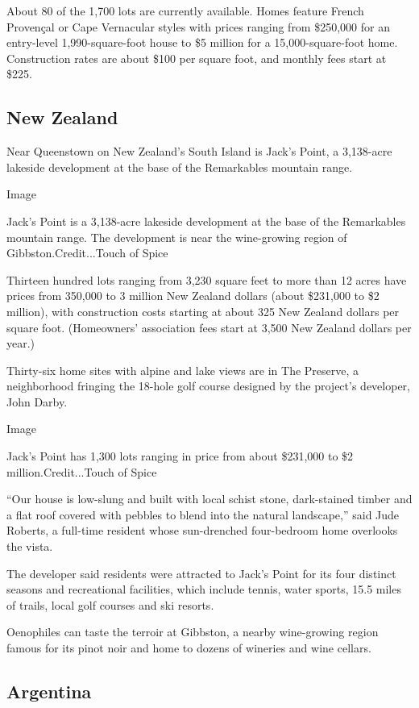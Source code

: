 About 80 of the 1,700 lots are currently available. Homes feature French
Provençal or Cape Vernacular styles with prices ranging from \$250,000
for an entry-level 1,990-square-foot house to \$5 million for a
15,000-square-foot home. Construction rates are about \$100 per square
foot, and monthly fees start at \$225.

\hypertarget{new-zealand}{%
\subsection{New Zealand}\label{new-zealand}}

Near Queenstown on New Zealand's South Island is Jack's Point, a
3,138-acre lakeside development at the base of the Remarkables mountain
range.

Image

Jack's Point is a 3,138-acre lakeside development at the base of the
Remarkables mountain range. The development is near the wine-growing
region of Gibbston.Credit...Touch of Spice

Thirteen hundred lots ranging from 3,230 square feet to more than 12
acres have prices from 350,000 to 3 million New Zealand dollars (about
\$231,000 to \$2 million), with construction costs starting at about 325
New Zealand dollars per square foot. (Homeowners' association fees start
at 3,500 New Zealand dollars per year.)

Thirty-six home sites with alpine and lake views are in The Preserve, a
neighborhood fringing the 18-hole golf course designed by the project's
developer, John Darby.

Image

Jack's Point has 1,300 lots ranging in price from about \$231,000 to \$2
million.Credit...Touch of Spice

``Our house is low-slung and built with local schist stone, dark-stained
timber and a flat roof covered with pebbles to blend into the natural
landscape,'' said Jude Roberts, a full-time resident whose sun-drenched
four-bedroom home overlooks the vista.

The developer said residents were attracted to Jack's Point for its four
distinct seasons and recreational facilities, which include tennis,
water sports, 15.5 miles of trails, local golf courses and ski resorts.

Oenophiles can taste the terroir at Gibbston, a nearby wine-growing
region famous for its pinot noir and home to dozens of wineries and wine
cellars.

\hypertarget{argentina}{%
\subsection{Argentina}\label{argentina}}

